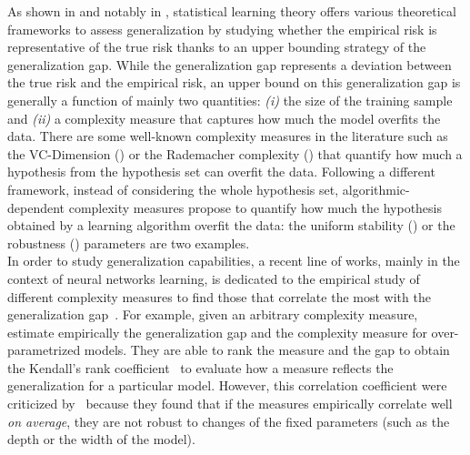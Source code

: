 As shown in  and notably in , statistical learning theory offers various theoretical frameworks to assess generalization by studying whether the empirical risk is representative of the true risk thanks to an upper bounding strategy of the generalization gap.
While the generalization gap represents a deviation between the true risk and the empirical risk, an upper bound on this generalization gap is generally a function of mainly two quantities: {\it (i)} the size of the training sample and {\it (ii)} a complexity measure that captures how much the model overfits the data.
There are some well-known complexity measures in the literature such as the VC-Dimension () or the Rademacher complexity () that quantify how much a hypothesis from the hypothesis set can overfit the data. 
Following a different framework, instead of considering the whole hypothesis set, algorithmic-dependent complexity measures propose to quantify how much the hypothesis obtained by a learning algorithm overfit the data: the uniform stability () or the robustness () parameters are two examples.\\

In order to study generalization capabilities, a recent line of works, mainly in the context of neural networks learning, is dedicated to the empirical study of different complexity measures to find those that correlate the most with the generalization gap~\citep{JiangNeyshaburMobahiKrishnanBengio2020,DziugaiteDrouinNealRajkumarCaballeroWangMitliagkasRoy2020,JiangNatekarSharma2021}. 
For example, given an arbitrary complexity measure, \citeauthor{JiangNeyshaburMobahiKrishnanBengio2020} estimate empirically the generalization gap and the complexity measure for over-parametrized models.
They are able to rank the measure and the gap to obtain the Kendall's rank coefficient~\citep{Kendall1938} to evaluate how a measure reflects the generalization for a particular model.
However, this correlation coefficient were criticized by~\citet{DziugaiteDrouinNealRajkumarCaballeroWangMitliagkasRoy2020} because they found that if the measures empirically correlate well {\it on average}, they are not robust to changes of the fixed parameters (such as the depth or the width of the model).\\

